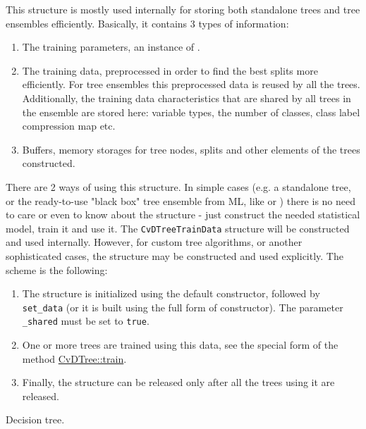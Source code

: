 This structure is mostly used internally for storing both standalone trees and tree ensembles efficiently. Basically, it contains 3 types of information:
\begin{enumerate}
\item{The training parameters, an instance of .}
\item{The training data, preprocessed in order to find the best splits more efficiently. For tree ensembles this preprocessed data is reused by all the trees. Additionally, the training data characteristics that are shared by all trees in the ensemble are stored here: variable types, the number of classes, class label compression map etc.}
\item{Buffers, memory storages for tree nodes, splits and other elements of the trees constructed.}
\end{enumerate}
There are 2 ways of using this structure. In simple cases (e.g. a standalone tree, or the ready-to-use "black box" tree ensemble from ML, like  or ) there is no need to care or even to know about the structure - just construct the needed statistical model, train it and use it. The \texttt{CvDTreeTrainData} structure will be constructed and used internally. However, for custom tree algorithms, or another sophisticated cases, the structure may be constructed and used explicitly. The scheme is the following:
\begin{enumerate}
\item{The structure is initialized using the default constructor, followed by \texttt{set\_data} (or it is built using the full form of constructor). The parameter \texttt{\_shared} must be set to \texttt{true}.}
\item{One or more trees are trained using this data, see the special form of the method \href{#CvDTree.3A.3Atrain}{CvDTree::train}.}
\item{Finally, the structure can be released only after all the trees using it are released.}
\end{enumerate}



Decision tree.

